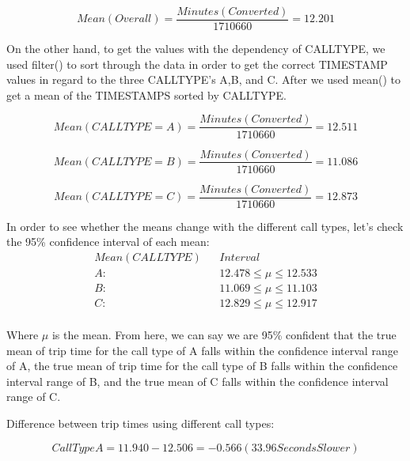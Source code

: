 \documentclass[11pt]{article}
\begin{document}
\begin{equation}
Mean (Overall) = \frac{Minutes (Converted)}{1710660} = 12.201
\end{equation}

\par
On the other hand, to get the values with the dependency of CALLTYPE, we used filter() to sort through the data in order to get the correct TIMESTAMP values in regard to the three CALLTYPE’s A,B, and C. After we used mean() to get a mean of the TIMESTAMPS sorted by CALLTYPE. 

\begin{equation}
Mean (CALLTYPE = A) = \frac{Minutes (Converted)}{1710660} = 12.511
\end{equation}

\begin{equation}
Mean (CALLTYPE = B) = \frac{Minutes (Converted)}{1710660} = 11.086
\end{equation}

\begin{equation}
Mean (CALLTYPE = C) = \frac{Minutes (Converted)}{1710660} = 12.873
\end{equation}

\par
In order to see whether the means change with the different call types, let's check the 95\% confidence interval of each mean:
\begin{equation*}
	\begin{aligned}
		Mean (CALL TYPE) &&Interval\\
A:  && 12.478 \le \mu \le 12.533\\
B:  && 11.069 \le \mu \le 11.103\\
C:  && 12.829 \le \mu \le 12.917\\
	\end{aligned}
\end{equation*}
\par
Where $\mu$ is the mean. From here, we can say we are 95\% confident that the true mean of trip time for the call type of A falls 
within the confidence interval range of A, the true mean of trip time for the call type of B falls within the confidence interval 
range of B, and the true mean of C falls within the confidence interval range of C.

\par
Difference between trip times using different call types:

\begin{equation}
Call Type A = 11.940 - 12.506 = -0.566 (33.96 Seconds Slower)
\end{equation}
\end{document}
